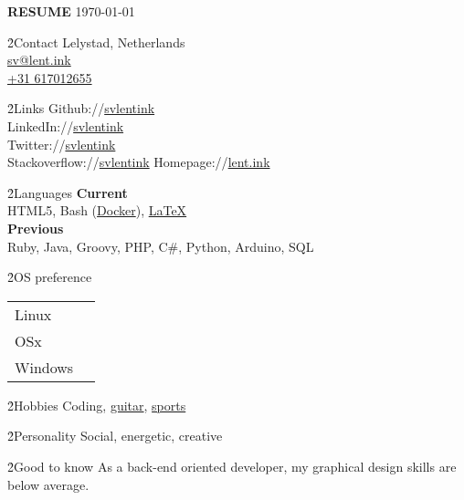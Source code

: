 \LARGE \textbf{RESUME}
\scriptsize \today \normalsize



\h{2}{Contact}{}
Lelystad, Netherlands \\
\href{mailto:sv@lent.ink}{sv@lent.ink} \\
\href{tel:0031617012655}{+31 617012655}

\h{2}{Links}{}
Github://\href{http://github.com/svlentink}{svlentink} \\
LinkedIn://\href{http://linkedin.com/in/svlentink}{svlentink} \\
Twitter://\href{http://twitter.com/svlentink}{svlentink} \\
Stackoverflow://\href{http://stackoverflow.com/users/3037245/svlentink}{svlentink}
Homepage://\href{http://lent.ink}{lent.ink}

\h{2}{Languages}{}
\textbf{Current} \\
HTML5,
Bash (\href{http://hub.docker.com/r/svlentink}{Docker}),
\href{https://github.com/svlentink/resume}{LaTeX}
\\
\textbf{Previous} \\
Ruby,
Java,
Groovy,
PHP,
C\#,
Python,
Arduino,
SQL

\h{2}{OS preference}{}
\begin{tabu} to  \linewidth { X[l]X[r] }
  Linux &  \\
	OSx &  \\
	Windows & 
\end{tabu}

\h{2}{Hobbies}{}
Coding,
\href{http://svlentink.co.nf/chords}{guitar},
\href{http://svlentink.co.nf/run}{sports}

\h{2}{Personality}{}
Social, energetic, creative

\h{2}{Good to know}{}
As a back-end oriented developer,
my graphical design skills are below average.
